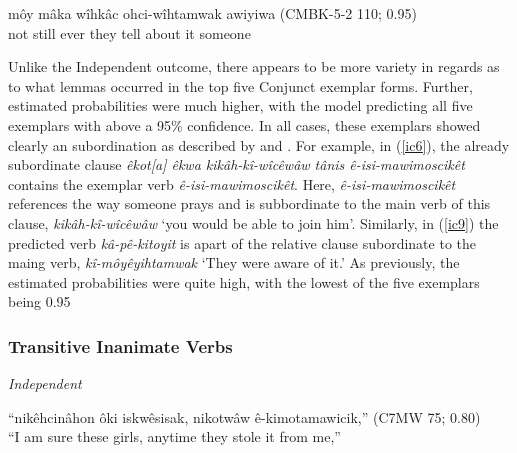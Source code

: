     \begin{exe}
    \ex 
    \gll môy mâka wîhkâc ohci-wîhtamwak awiyiwa \tiny{(CMBK-5-2 110; 0.95)}\\
    not still ever {they tell about it} someone\\
    \label{ic10}
    \end{exe}
    
    Unlike the Independent outcome, there appears to be more variety in regards as to what lemmas occurred in the top five Conjunct exemplar forms. Further, estimated probabilities were much higher, with the model predicting all five exemplars with above a 95\% confidence. In all cases, these exemplars showed clearly an subordination as described by \citet{Cook2014} and \citet{Wolfart1973}. For example, in (\ref{ic6}), the already subordinate clause \textit{êkot[a] êkwa kikâh-kî-wîcêwâw tânis ê-isi-mawimoscikêt} contains the exemplar verb \textit{ê-isi-mawimoscikêt}. Here, \textit{ê-isi-mawimoscikêt} references the way someone prays and is subbordinate to the main verb of this clause, \textit{kikâh-kî-wîcêwâw} `you would be able to join him'. Similarly, in (\ref{ic9}) the predicted verb \textit{kâ-pê-kitoyit} is apart of the relative clause subordinate to the maing verb, \textit{kî-môyêyihtamwak} `They were aware of it.' As previously, the estimated probabilities were quite high, with the lowest of the five exemplars being 0.95
    

\subsubsection{Transitive Inanimate Verbs}

\textit{Independent}
    \begin{exe}
    \ex 
    \gll ``nikêhcinâhon ôki iskwêsisak, nikotwâw ê-kimotamawicik,'' \tiny{(C7MW 75; 0.80)} \\
         ``{I am sure} these girls, anytime {they stole it from me},'' \\
    \label{vti-ivc1}
    \end{exe}

